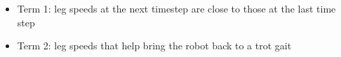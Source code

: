 \begin{itemize}
\item Term 1: leg speeds at the next timestep are close to those at the last time step
\item Term 2: leg speeds that help bring the robot back to a trot gait
\end{itemize}
